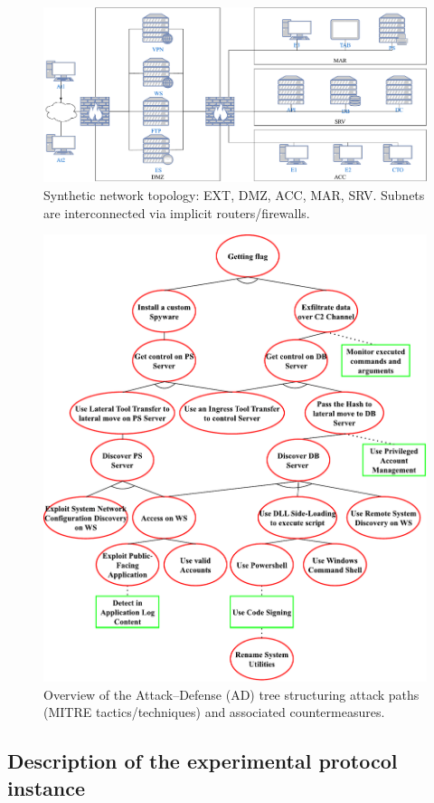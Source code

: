 \begin{figure}[h!]
\centering
\includegraphics[width=\linewidth]{figures/topology.pdf}
\caption{Synthetic network topology: EXT, DMZ, ACC, MAR, SRV. Subnets are interconnected via implicit routers/firewalls.}
\label{fig:scenario_network_topology}
\end {figure}

\begin{figure}[h!]
  \centering
  \includegraphics[width=0.86\linewidth]{figures/ADTree.pdf}
  \caption{Overview of the Attack–Defense (AD) tree structuring attack paths (MITRE tactics/techniques) and associated countermeasures. }
  \label{fig:ADTree}
\end{figure}


\subsection{Description of the experimental protocol instance}

